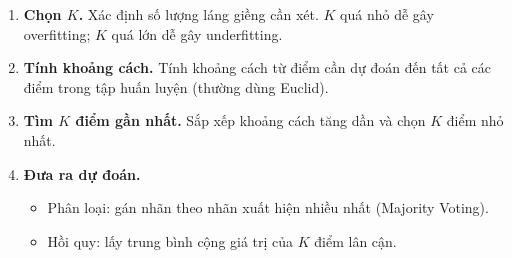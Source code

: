 \documentclass[12pt,a4paper]{article}
\begin{document}
\begin{enumerate}
    \item \textbf{Chọn $K$.} Xác định số lượng láng giềng cần xét. $K$ quá nhỏ dễ gây overfitting; $K$ quá lớn dễ gây underfitting.
    \item \textbf{Tính khoảng cách.} Tính khoảng cách từ điểm cần dự đoán đến tất cả các điểm trong tập huấn luyện (thường dùng Euclid).
    \item \textbf{Tìm $K$ điểm gần nhất.} Sắp xếp khoảng cách tăng dần và chọn $K$ điểm nhỏ nhất.
    \item \textbf{Đưa ra dự đoán.}
    \begin{itemize}
        \item Phân loại: gán nhãn theo nhãn xuất hiện nhiều nhất (Majority Voting).
        \item Hồi quy: lấy trung bình cộng giá trị của $K$ điểm lân cận.
    \end{itemize}
\end{enumerate}
\end{document}
